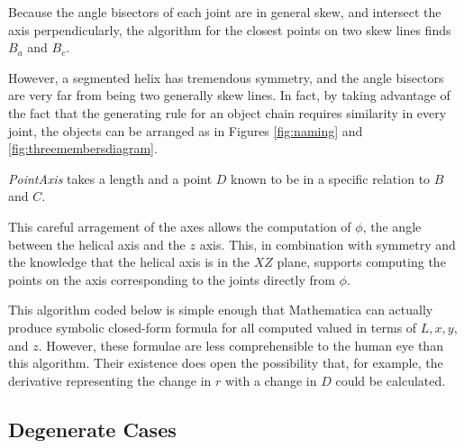 \documentclass[11pt]{article}
\begin{document}
{Because the angle bisectors of each joint are in general skew, and intersect the
axis perpendicularly, the algorithm
for the closest points on two skew lines finds $B_a$ and $B_c$.

However, a segmented helix has
tremendous symmetry, and the angle bisectors are very far from being two
generally skew lines. In fact, by taking advantage of the fact that the
generating rule for an object chain requires similarity in every joint,
the objects can be arranged as in Figures \ref{fig:naming} and \ref{fig:threemembersdiagram}.

{\em PointAxis} takes a length and a point $D$ known to be in
a specific relation to $B$ and $C$.

This careful arragement of the axes
allows the computation of $\phi$, the angle between the helical axis
and the $z$ axis. This, in combination with symmetry and the knowledge
that the helical axis is in the $XZ$ plane, supports computing the
points on the axis corresponding to the joints directly from $\phi$.

This algorithm coded below is simple enough that Mathematica\cite{Mathematica} can
actually produce symbolic closed-form formula for all computed valued
in terms of $L, x, y$, and $z$.
However, these formulae are less comprehensible to the
human eye than this algorithm.
Their existence does open
the possibility that, for example, the derivative representing
the change in $r$ with a change in $D$ could be calculated.

\subsection{Degenerate Cases}

}
\end{document}
